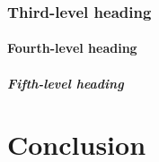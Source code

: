 \documentclass[letterpaper,12pt,twoside]{article}
\begin{document}
\subsubsection{Third-level heading}

\lipsum[5]

\paragraph{Fourth-level heading}

\noindent\lipsum[6]

\subparagraph{Fifth-level heading}

\noindent\lipsum[7]

\section*{Conclusion}

\lipsum[8]
\end{document}
